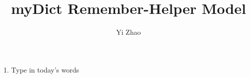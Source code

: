 \documentclass{article}
\begin{document}
\title{myDict Remember-Helper Model}
\author{Yi Zhao}
\maketitle

1. Type in today's words
\end{document}
